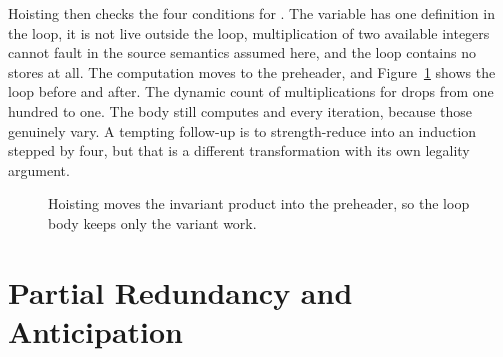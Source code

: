 Hoisting then checks the four conditions for .
The variable  has one definition in the loop, it is not live outside the loop, multiplication of two available integers cannot fault in the source semantics assumed here, and the loop contains no stores at all.
The computation moves to the preheader, and Figure~\ref{fig:ch17-hoist} shows the loop before and after.
The dynamic count of multiplications for  drops from one hundred to one.
The body still computes  and  every iteration, because those genuinely vary.
A tempting follow-up is to strength-reduce  into an induction stepped by four, but that is a different transformation with its own legality argument.

\begin{figure}
  \centering
  \caption{Hoisting moves the invariant product into the preheader, so the loop body keeps only the variant work.}
  \label{fig:ch17-hoist}
\end{figure}

\section{Partial Redundancy and Anticipation}
\label{sec:ch17-partial-redundancy}

